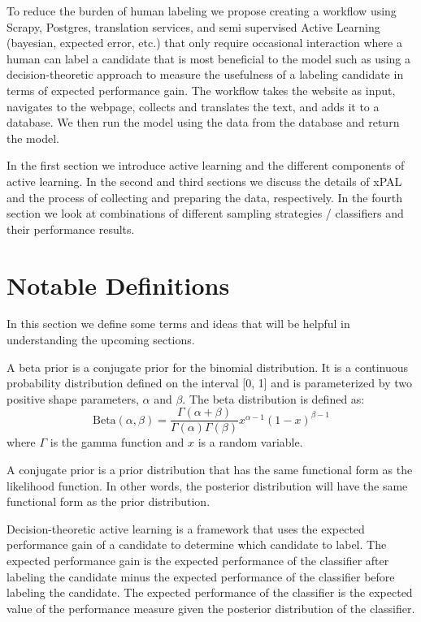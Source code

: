 To reduce the burden of human labeling we propose creating a workflow using Scrapy, Postgres, translation services, and semi supervised Active Learning (bayesian, expected error, etc.) that only require occasional interaction where a human can label a candidate that is most beneficial to the model such as using a decision-theoretic approach to measure the usefulness of a labeling candidate in terms of expected performance gain. The workflow takes the website as input, navigates to the webpage, collects and translates the text, and adds it to a database. We then run the model using the data from the database and return the model. 

In the first section we introduce active learning and the different components of active learning. In the second and third sections we discuss the details of xPAL and the process of collecting and preparing the data, respectively. In the fourth section we look at combinations of different sampling strategies / classifiers and their performance results.

\section{Notable Definitions}

In this section we define some terms and ideas that will be helpful in understanding the upcoming sections.

\begin{defn}
\label{def:beta_prior}
A beta prior is a conjugate prior for the binomial distribution. It is a continuous probability distribution defined on the interval [0, 1] and is parameterized by two positive shape parameters, \(\alpha\) and \(\beta\). The beta distribution is defined as: 
\[\text{Beta}(\alpha, \beta) = \frac{\Gamma(\alpha + \beta)}{\Gamma(\alpha)\Gamma(\beta)}x^{\alpha - 1}(1 - x)^{\beta - 1}\]
where \(\Gamma\) is the gamma function and \(x\) is a random variable.
\end{defn}

\begin{defn}
\label{def:conjugate_prior}
A conjugate prior is a prior distribution that has the same functional form as the likelihood function. In other words, the posterior distribution will have the same functional form as the prior distribution.
\end{defn}

\begin{defn}
\label{def:decision_theoretic}
Decision-theoretic active learning is a framework that uses the expected performance gain of a candidate to determine which candidate to label. The expected performance gain is the expected performance of the classifier after labeling the candidate minus the expected performance of the classifier before labeling the candidate. The expected performance of the classifier is the expected value of the performance measure given the posterior distribution of the classifier.
\end{defn}

